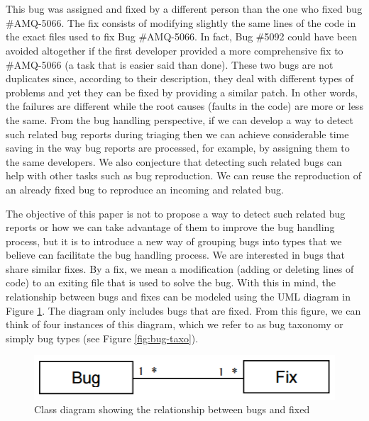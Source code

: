 \\ \\
This bug was assigned and fixed by a different person than the one who fixed bug \#AMQ-5066.
The fix consists of modifying slightly the same lines of the code in the exact files used to fix Bug \#AMQ-5066.
In fact, Bug \#5092 could have been avoided altogether if the first developer provided a more comprehensive fix to \#AMQ-5066 (a task that is easier said than done).
These two bugs are not duplicates since, according to their description, they deal with different types of problems and yet they can be fixed by providing a similar patch.
In other words, the failures are different while the root causes (faults in the code) are more or less the same.
From the bug handling perspective, if we can develop a way to detect such related bug reports during triaging then we can achieve considerable time saving in the way bug reports are processed, for example, by assigning them to the same developers.
We also conjecture that detecting such related bugs can help with other tasks such as bug reproduction.
We can  reuse the reproduction of an already fixed bug to reproduce an incoming and related bug.

The objective of this paper is not to propose a way to detect such related bug reports or how we can take advantage of them to improve the bug handling process, but it is to introduce a new way of grouping bugs into types that we believe can facilitate the bug handling process.  We are interested in bugs that share similar fixes.
By a fix, we mean a modification (adding or deleting lines of
code) to an exiting file that is used to solve the bug. With this
in mind, the relationship between bugs and fixes can be
modeled using the UML diagram in Figure \ref{fig:bug-taxo-diag}. The diagram
only includes bugs that are fixed. From this figure, we can
think of four instances of this diagram, which we refer to as
bug taxonomy or simply bug types (see Figure \ref{fig:bug-taxo}).

\begin{figure}[h!]
  \centering
    \includegraphics[scale=0.5]{media/bug-taxo-class-diag.png}
    \caption{Class diagram showing the relationship between bugs and fixed
    \label{fig:bug-taxo-diag}}
\end{figure}


